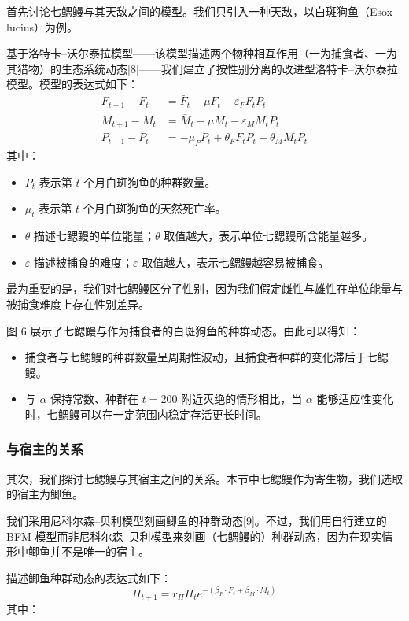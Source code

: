 \documentclass[11pt,a4paper]{ctexart}
\begin{document}
首先讨论七鳃鳗与其天敌之间的模型。我们只引入一种天敌，以白斑狗鱼（Esox lucius）为例。

基于洛特卡–沃尔泰拉模型——该模型描述两个物种相互作用（一为捕食者、一为其猎物）的生态系统动态[8]——我们建立了按性别分离的改进型洛特卡–沃尔泰拉模型。模型的表达式如下：
\begin{align}
F_{t+1}-F_t&=\bar F_t-\mu F_t-\varepsilon_F F_t P_t \tag{8}\\
M_{t+1}-M_t&=\bar M_t-\mu M_t-\varepsilon_M M_t P_t \tag{9}\\
P_{t+1}-P_t&=-\mu_P P_t+\theta_F F_t P_t+\theta_M M_t P_t \tag{10}
\end{align}
其中：

\begin{itemize}
\item $P_t$ 表示第 $t$ 个月白斑狗鱼的种群数量。
\item $\mu_t$ 表示第 $t$ 个月白斑狗鱼的天然死亡率。
\item $\theta$ 描述七鳃鳗的单位能量；$\theta$ 取值越大，表示单位七鳃鳗所含能量越多。
\item $\varepsilon$ 描述被捕食的难度；$\varepsilon$ 取值越大，表示七鳃鳗越容易被捕食。
\end{itemize}

最为重要的是，我们对七鳃鳗区分了性别，因为我们假定雌性与雄性在单位能量与被捕食难度上存在性别差异。

图 6 展示了七鳃鳗与作为捕食者的白斑狗鱼的种群动态。由此可以得知：

\begin{itemize}
\item 捕食者与七鳃鳗的种群数量呈周期性波动，且捕食者种群的变化滞后于七鳃鳗。
\item 与 $\alpha$ 保持常数、种群在 $t=200$ 附近灭绝的情形相比，当 $\alpha$ 能够适应性变化时，七鳃鳗可以在一定范围内稳定存活更长时间。
\end{itemize}

\subsubsection{与宿主的关系}

其次，我们探讨七鳃鳗与其宿主之间的关系。本节中七鳃鳗作为寄生物，我们选取的宿主为鲫鱼。

我们采用尼科尔森–贝利模型刻画鲫鱼的种群动态[9]。不过，我们用自行建立的 BFM 模型而非尼科尔森–贝利模型来刻画（七鳃鳗的）种群动态，因为在现实情形中鲫鱼并不是唯一的宿主。

描述鲫鱼种群动态的表达式如下：
\begin{equation}
H_{t+1}=r_H H_t e^{-(\beta_F\cdot F_t+\beta_M\cdot M_t)} \tag{11}
\end{equation}
其中：
\end{document}
